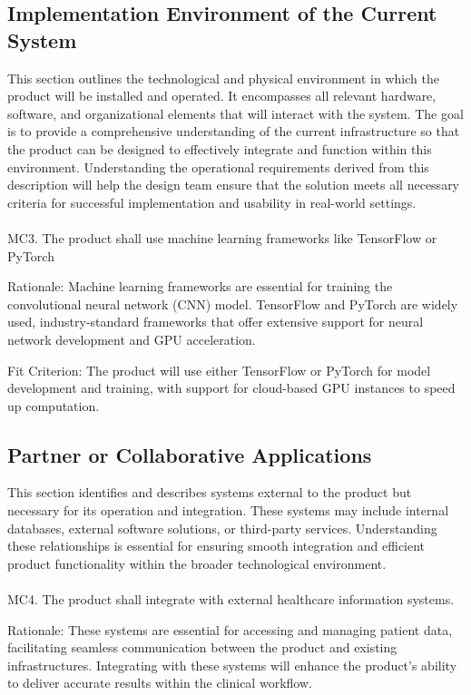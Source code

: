\documentclass[12pt]{article}
\begin{document}
\subsection{Implementation Environment of the Current System}
This section outlines the technological and physical environment in which the product will be 
installed and operated. It encompasses all relevant hardware, software, and organizational 
elements that will interact with the system. The goal is to provide a comprehensive understanding 
of the current infrastructure so that the product can be designed to effectively integrate and 
function within this environment. Understanding the operational requirements derived from this 
description will help the design team ensure that the solution meets all necessary criteria for 
successful implementation and usability in real-world settings.
\\\\
\noindent
MC3. The product shall use machine learning frameworks like TensorFlow or PyTorch

Rationale: Machine learning frameworks are essential for training the convolutional neural network 
(CNN) model. TensorFlow and PyTorch are widely used, industry-standard frameworks that offer 
extensive support for neural network development and GPU acceleration.

Fit Criterion: The product will use either TensorFlow or PyTorch for model development and 
training, with support for cloud-based GPU instances to speed up computation.

\subsection{Partner or Collaborative Applications}
This section identifies and describes systems external to the product but necessary for its 
operation and integration. These systems may include internal databases, external software 
solutions, or third-party services. Understanding these relationships is essential for ensuring 
smooth integration and efficient product functionality within the broader technological 
environment.
\\\\
\noindent
MC4. The product shall integrate with external healthcare information systems.

Rationale: These systems are essential for accessing and managing patient data, facilitating 
seamless communication between the product and existing infrastructures. Integrating with these 
systems will enhance the product's ability to deliver accurate results within the clinical 
workflow.
\end{document}

